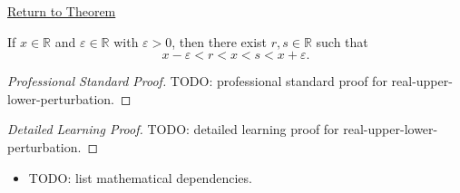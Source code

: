 \newpage
{}
\label{prf:real-upper-lower-perturbation}

\begin{remark*}[Return]
\hyperref[thm:real-upper-lower-perturbation]{Return to Theorem}
\end{remark*}

\begin{theorem*}
If $x\in\mathbb{R}$ and $\varepsilon\in\mathbb{R}$ with $\varepsilon>0$, then
there exist $r,s\in\mathbb{R}$ such that
\[
x-\varepsilon<r<x<s<x+\varepsilon.
\]
\end{theorem*}

\begin{proof}[Professional Standard Proof]
\LRAProofBodyStart
TODO: professional standard proof for real-upper-lower-perturbation.
\end{proof}

\begin{proof}[Detailed Learning Proof]
\LRAProofBodyStart
TODO: detailed learning proof for real-upper-lower-perturbation.
\end{proof}

\begin{remark*}
\end{remark*}

\begin{dependencies}
\begin{itemize}
  \item TODO: list mathematical dependencies.
\end{itemize}
\end{dependencies}

\clearpage
